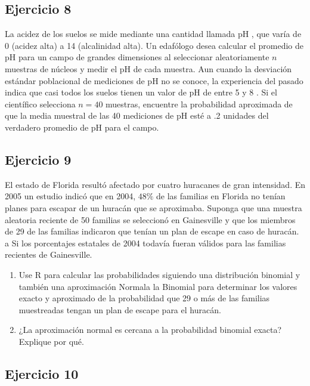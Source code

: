 \documentclass[
]{article}
\begin{document}
\subsection{Ejercicio 8}\label{ejercicio-8-1}

La acidez de los suelos se mide mediante una cantidad llamada pH , que varía de 0 (acidez alta) a 14 (alcalinidad alta). Un edafólogo desea calcular el promedio de pH para un campo de grandes dimensiones al seleccionar aleatoriamente \(n\) muestras de núcleos y medir el pH de cada muestra. Aun cuando la
desviación estándar poblacional de mediciones de pH no se conoce, la experiencia del pasado indica que casi todos los suelos tienen un valor de pH de entre 5 y 8 . Si el científico selecciona \(n=40\) muestras, encuentre la probabilidad aproximada de que la media muestral de las 40 mediciones de pH esté a .2 unidades del verdadero promedio de pH para el campo.

\subsection{Ejercicio 9}\label{ejercicio-9}

El estado de Florida resultó afectado por cuatro huracanes de gran intensidad. En 2005 un estudio indicó que en 2004, \(48 \%\) de las familias en Florida no tenían planes para escapar de un huracán que se aproximaba. Suponga que una muestra aleatoria reciente de 50 familias se seleccionó en Gainesville y que los miembros de 29 de las familias indicaron que tenían un plan de escape en caso de huracán.
a Si los porcentajes estatales de 2004 todavía fueran válidos para las familias recientes de Gainesville.

\begin{enumerate}
\def\labelenumi{\alph{enumi}.}
\item
  Use R para calcular las probabilidades siguiendo una distribución binomial y también una aproximación Normala la Binomial para determinar los valores exacto y aproximado de la probabilidad que 29 o más de las familias muestreadas tengan un plan de escape para el huracán.
\item
  ¿La aproximación normal es cercana a la probabilidad binomial exacta? Explique por qué.
\end{enumerate}

\subsection{Ejercicio 10}\label{ejercicio-10}
\end{document}
